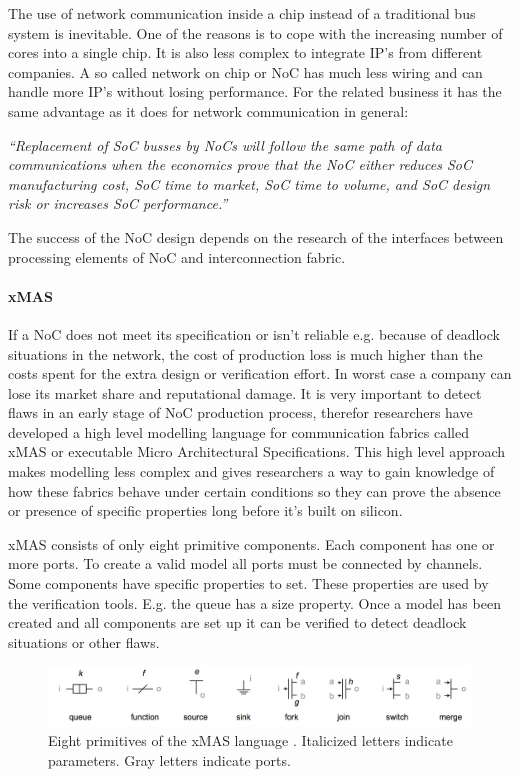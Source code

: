 The use of network communication inside a chip instead of a traditional bus
system is inevitable. One of the reasons is to cope with the increasing number
of cores into a single chip. It is also less complex to integrate IP's from
different companies. A so called network on chip or NoC has much less wiring
\cite{NoC-busses} and can handle more IP's without losing performance. For the
related business it has the same advantage as it does for network communication
in general:

\textit{``Replacement of SoC busses by NoCs will follow the same path of data
communications when the economics prove that the NoC either reduces SoC
manufacturing cost, SoC time to market, SoC time to volume, and SoC design risk
or increases SoC performance.''} \cite{NoC-busses} 

The success of the NoC design depends on the research of the interfaces between
processing elements of NoC and interconnection fabric.

\paragraph{xMAS}

If a NoC does not meet its specification or isn't reliable e.g. because of
deadlock situations in the network, the cost of production loss is much higher
than the costs spent for the extra design or verification effort. In worst case
a company can lose its market share and reputational damage. It is very
important to detect flaws in an early stage of NoC production process, therefor
researchers have developed a high level modelling language for communication
fabrics called xMAS or executable Micro Architectural Specifications. This high
level approach makes modelling less complex and gives researchers a way to gain
knowledge of how these fabrics behave under certain conditions so they can prove
the absence or presence of specific properties long before it's built on
silicon.

xMAS consists of only eight primitive components. Each component has one or more
ports. To create a valid model all ports must be connected by channels. Some
components have specific properties to set. These properties are used by the
verification tools. E.g. the queue has a size property. Once a model has been
created and all components are set up it can be verified to detect deadlock
situations or other flaws.

\begin{figure}[here]
\includegraphics[width=1.0\textwidth]{xmas-language}
\caption{Eight primitives of the xMAS language \cite{6225465}. Italicized letters indicate
parameters. Gray letters indicate ports.}
\label{fig:xmas-language}
\end{figure}

